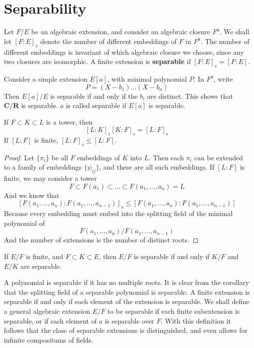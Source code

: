\section{Separability}

Let $F/E$ be an algebraic extension, and consider an algebraic closure $F^{\mathfrak{a}}$. We shall let $[F:E]_s$ denote the number of different embeddings of $F$ in $F^{\mathfrak{a}}$. The number of different embeddings is invariant of which algebraic closure we choose, since any two closures are isomorphic. A finite extension is {\bf separable} if $[F:E]_s = [F:E]$.

\begin{example}
    Consider a simple extension $E[a]$, with minimal polynomial $P$. In $F^{\mathfrak{a}}$, write
    \[ P = (X - b_1) \dots (X - b_n) \]
    Then $E[a]/E$ is separable if and only if the $b_i$ are distinct. This shows that $\mathbf{C}/\mathbf{R}$ is separable. $a$ is called separable if $E[a]$ is separable.
\end{example}

\begin{theorem}
    If $F \subset K \subset L$ is a tower, then
    \[ [L:K]_s [K:F]_s = [L:F]_s \]
    If $[L:F]$ is finite, $[L:F]_s \leq [L:F]$.
\end{theorem}
\begin{proof}
    Let $\{ \pi_i \}$ be all $F$ embeddings of $K$ into $L$. Then each $\pi_i$ can be extended to a family of embeddings $\{ \psi_{ij} \}$, and these are all such embeddings. If $[L:F]$ is finite, we may consider a tower
    \[ F \subset F(a_1) \subset \dots \subset F(a_1, \dots, a_n) = L \]
    And we know that
    \[ [F(a_1, \dots, a_n): F(a_1, \dots, a_{n-1})]_s \leq [F(a_1, \dots, a_n): F(a_1, \dots, a_{n-1})] \]
    Because every embedding must embed into the splitting field of the minimal polynomial of
    \[ F(a_1, \dots, a_n)/F(a_1, \dots, a_{n-1}) \]
    And the number of extensions is the number of distinct roots.
\end{proof}

\begin{corollary}
    If $E/F$ is finite, and $F \subset K \subset E$, then $E/F$ is separable if and only if $K/F$ and $E/K$ are separable.
\end{corollary}

A polynomial is separable if it has no multiple roots. It is clear from the corollary that the splitting field of a separable polynomial is separable. A finite extension is separable if and only if each element of the extension is separable. We shall define a general algebraic extension $E/F$ to be separable if each finite subextension is separable, or if each element of $a$ is separable over $F$. With this definition it follows that the class of separable extensions is distinguished, and even allows for infinite compositums of fields.

